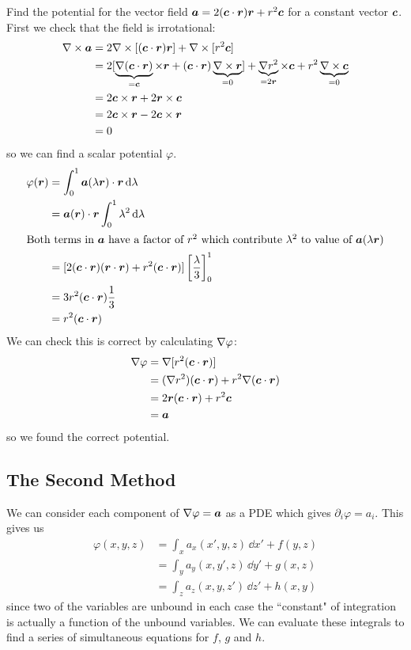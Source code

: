 \documentclass{article}
\begin{document}
    \example
    Find the potential for the vector field \(\bm{a} = 2(\bm{c}\cdot\bm{r})\bm{r} + r^2\bm{c}\) for a constant vector \(\bm{c}\).
    First we check that the field is irrotational:
    \begin{align*}
        \nabla\times\bm{a} &= 2\nabla\times[(\bm{c}\cdot\bm{r})\bm{r}] + \nabla\times[r^2\bm{c}]\\
        &= 2[\underbrace{\nabla(\bm{c}\cdot\bm{r})}_{=\bm{c}}\times\bm{r} + (\bm{c}\cdot\bm{r})\underbrace{\nabla\times\bm{r}}_{=0}] + \underbrace{\nabla r^2}_{=2\bm{r}}\times\bm{c} + r^2\underbrace{\nabla\times\bm{c}}_{=0}\\
        &= 2\bm{c}\times\bm{r} + 2\bm{r}\times\bm{c}\\
        &= 2\bm{c}\times\bm{r} - 2\bm{c}\times\bm{r}\\
        &= 0
    \end{align*}
    so we can find a scalar potential \(\varphi\).
    \begin{align*}
        \varphi(\bm{r}) &= \int_0^1\bm{a}(\lambda\bm{r})\cdot\bm{r}\,\dd\lambda\\
        &= \bm{a}(\bm{r})\cdot\bm{r}\int_0^1\lambda^2\,\dd\lambda\\
        \intertext{Both terms in \(\bm{a}\) have a factor of \(r^2\) which contribute \(\lambda^2\) to value of \(\bm{a}(\lambda\bm{r})\)}
        &= [2(\bm{c}\cdot\bm{r})(\bm{r}\cdot\bm{r}) + r^2(\bm{c}\cdot\bm{r})]\left[\frac{\lambda}{3}\right]_0^1\\
        &= 3r^2(\bm{c}\cdot\bm{r})\frac{1}{3}\\
        &= r^2(\bm{c}\cdot\bm{r})
    \end{align*}
    We can check this is correct by calculating \(\nabla\varphi\):
    \begin{align*}
        \nabla\varphi &= \nabla[r^2(\bm{c}\cdot\bm{r})]\\
        &= (\nabla r^2)(\bm{c}\cdot\bm{r}) + r^2\nabla(\bm{c}\cdot\bm{r})\\
        &= 2\bm{r}(\bm{c}\cdot\bm{r}) + r^2\bm{c}\\
        &= \bm{a}
    \end{align*}
    so we found the correct potential.
    
    \subsection{The Second Method}
    We can consider each component of \(\nabla\varphi = \bm{a}\) as a PDE which gives \(\partial_i \varphi = a_i\).
    This gives us
    \begin{align*}
        \varphi(x, y, z) &= \int_x a_x(x', y, z)\,\dd x' + f(y, z)\\
        &= \int_y a_y(x, y', z)\,\dd y' + g(x, z)\\
        &= \int_z a_z(x, y, z')\,\dd z' + h(x, y)
    \end{align*}
    since two of the variables are unbound in each case the ``constant" of integration is actually a function of the unbound variables.
    We can evaluate these integrals to find a series of simultaneous equations for \(f\), \(g\) and \(h\).
    
\end{document}
